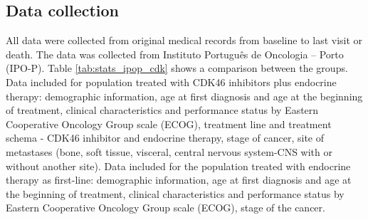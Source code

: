 
 


\subsection{Data collection}
All data were collected from original medical records from baseline to last visit or death.
The data was collected from Instituto Português de Oncologia – Porto (IPO-P).  Table \ref{tab:stats_ipop_cdk} shows a comparison between the groups.
Data included for population treated with CDK4\/6 inhibitors plus endocrine therapy: demographic information, age at first diagnosis and age at the beginning of treatment, clinical characteristics and performance status by Eastern Cooperative Oncology Group scale (ECOG), treatment line and treatment schema -  CDK4\/6 inhibitor and endocrine therapy, stage of cancer, site of metastases (bone, soft tissue, visceral, central nervous system-CNS with or without another site).
Data included for the population treated with endocrine therapy as first-line: demographic information, age at first diagnosis and age at the beginning of treatment, clinical characteristics and performance status by Eastern Cooperative Oncology Group scale (ECOG),  stage of the cancer.

